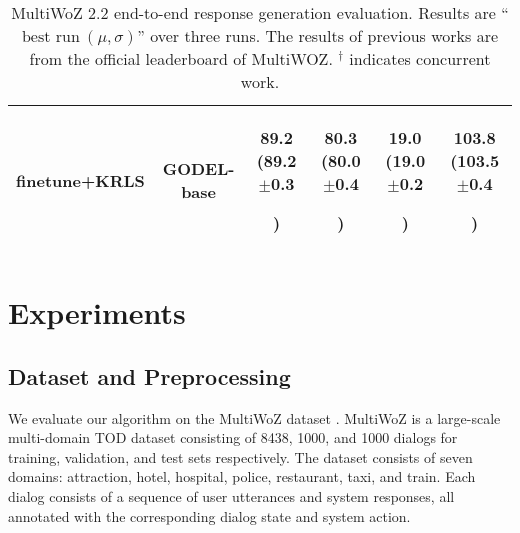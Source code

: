 \begin{table*}[!t]
{\begin{tabular}{l c c c c c}
finetune+KRLS  & GODEL-base 
  &\textbf{89.2} (\small 89.2$\pm$0.3\par)& \textbf{80.3} (\small 80.0$\pm$0.4\par)
  &{19.0} (\small 19.0$\pm$0.2\par) & \textbf{103.8} (\small 103.5$\pm$0.4\par)  \\
\bottomrule
  \end{tabular}
  }
  \caption{MultiWoZ 2.2 end-to-end response generation evaluation. Results are ``$\text{best run}\ (\mu, \sigma)$'' over three runs. The results of previous works are from the official leaderboard of MultiWOZ. $^{\dagger}$ indicates concurrent work.}
  \label{tbl:multiwoz_results}
  \vspace{5pt}
\end{table*}
\begin{table}[]
  \centering
  \caption{Training speed comparison between KRLS and RL. In standard RL (), auto-regressive sequence generation is used for experience collection.}
  \label{tbl:training_time}
\end{table}
\section{Experiments}
\label{sec:Experiments}

\subsection{Dataset and Preprocessing}
\label{sec:Dataset and Preprocessing}
We evaluate our algorithm on the MultiWoZ dataset \cite{multiwoz}. MultiWoZ is a large-scale multi-domain TOD dataset consisting of 8438, 1000, and 1000 dialogs for training, validation, and test sets respectively. The dataset consists of seven domains: attraction, hotel, hospital, police, restaurant, taxi, and train. Each dialog consists of a sequence of user utterances and system responses, all annotated with the corresponding dialog state and system action.

